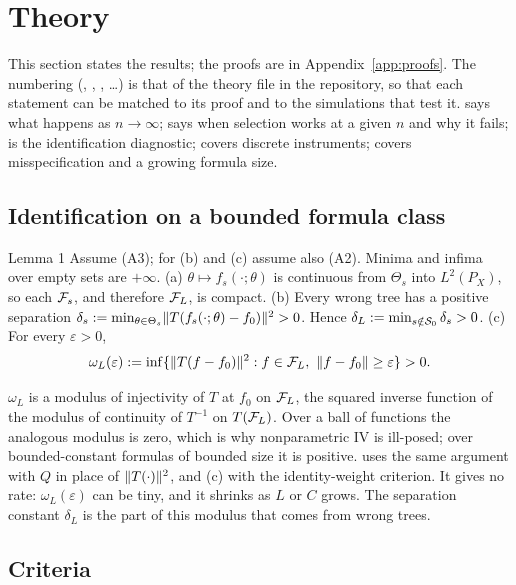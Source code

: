 \section{Theory}
\label{sec:theory}

This section states the results; the proofs are in Appendix~\ref{app:proofs}. The numbering (, , , \dots) is that of the theory file in the repository, so that each statement can be matched to its proof and to the simulations that test it.  says what happens as $n \to \infty$;  says when selection works at a given $n$ and why it fails;  is the identification diagnostic;  covers discrete instruments;  covers misspecification and a growing formula size.

\subsection{Identification on a bounded formula class}

\begin{result}[Lemma1]{Lemma 1}
Assume (A3); for (b) and (c) assume also (A2). Minima and infima over empty sets are $+\infty$.
(a) $\theta \mapsto f_s(\cdot;\theta)$ is continuous from $\Theta_s$ into $L^2(P_X)$, so each $\mathcal{F}_s$, and therefore $\mathcal{F}_L$, is compact.
(b) Every wrong tree has a positive separation $\delta_s := \min_{\theta \in \Theta_s}\lVert T(f_s(\cdot;\theta) - f_0)\rVert^2 > 0$. Hence $\delta_L := \min_{s \notin \mathcal{S}_0}\delta_s > 0$.
(c) For every $\varepsilon > 0$,
\[
\omega_L(\varepsilon) := \inf\{\lVert T(f - f_0)\rVert^2 : f \in \mathcal{F}_L,\ \lVert f - f_0\rVert \ge \varepsilon\} > 0.
\]
\end{result}

$\omega_L$ is a modulus of injectivity of $T$ at $f_0$ on $\mathcal{F}_L$, the squared inverse function of the modulus of continuity of $T^{-1}$ on $T(\mathcal{F}_L)$. Over a ball of functions the analogous modulus is zero, which is why nonparametric IV is ill-posed; over bounded-constant formulas of bounded size it is positive.  uses the same argument with $Q$ in place of $\lVert T(\cdot)\rVert^2$, and (c) with the identity-weight criterion. It gives no rate: $\omega_L(\varepsilon)$ can be tiny, and it shrinks as $L$ or $C$ grows. The separation constant $\delta_L$ is the part of this modulus that comes from wrong trees.

\subsection{Criteria}
\label{sec:criteria}

